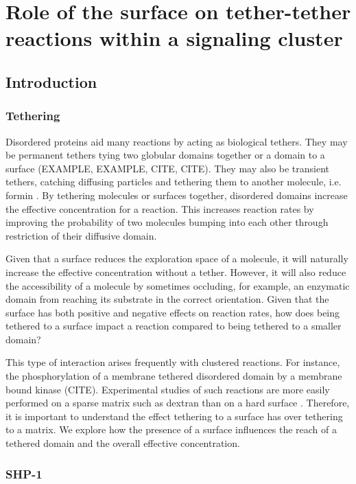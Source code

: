 \documentclass[../../AdvancementSummary.tex]{subfiles}
\begin{document}
\section{Role of the surface on tether-tether reactions within a signaling cluster}

\subsection{Introduction}
\subsubsection{Tethering}

Disordered proteins aid many reactions by acting as biological tethers. They may be permanent tethers tying two globular domains together or a domain to a surface (EXAMPLE, EXAMPLE, CITE, CITE). They may also be transient tethers, catching diffusing particles and tethering them to another molecule, i.e. formin \cite{Bryant2017}. By tethering molecules or surfaces together, disordered domains increase the effective concentration for a reaction. This increases reaction rates by improving the probability of two molecules bumping into each other through restriction of their diffusive domain.

Given that a surface reduces the exploration space of a molecule, it will naturally increase the effective concentration without a tether. However, it will also reduce the accessibility of a molecule by sometimes occluding, for example, an enzymatic domain from reaching its substrate in the correct orientation. Given that the surface has both positive and negative effects on reaction rates, how does being tethered to a surface impact a reaction compared to being tethered to a smaller domain? 

This type of interaction arises frequently with clustered reactions. For instance, the phosphorylation of a membrane tethered disordered domain by a membrane bound kinase (CITE). Experimental studies of such reactions are more easily performed on a sparse matrix such as dextran than on a hard surface \cite{Goyette2017}. Therefore, it is important to understand the effect tethering to a surface has over tethering to a matrix. We explore how the presence of a surface influences the reach of a tethered domain and the overall effective concentration.

\subsubsection{SHP-1}
\end{document}
